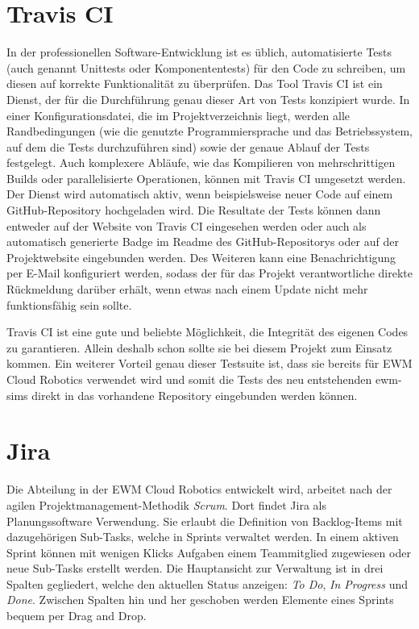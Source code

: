 \section{Travis CI}
\label{sec:travis-desc}
In der professionellen Software-Entwicklung ist es üblich, automatisierte Tests (auch genannt Unittests oder Komponententests) für den Code zu schreiben, um diesen auf korrekte Funktionalität zu überprüfen.
Das Tool Travis CI ist ein Dienst, der für die Durchführung genau dieser Art von Tests konzipiert wurde.
In einer Konfigurationsdatei, die im Projektverzeichnis liegt, werden alle Randbedingungen (wie die genutzte Programmiersprache und das Betriebssystem, auf dem die Tests durchzuführen sind) sowie der genaue Ablauf der Tests festgelegt.
Auch komplexere Abläufe, wie das Kompilieren von mehrschrittigen Builds oder parallelisierte Operationen, können mit Travis CI umgesetzt werden.
Der Dienst wird automatisch aktiv, wenn beispielsweise neuer Code auf einem GitHub-Repository hochgeladen wird.
Die Resultate der Tests können dann entweder auf der Website von Travis CI eingesehen werden oder auch als automatisch generierte Badge im Readme des GitHub-Repositorys oder auf der Projektwebsite eingebunden werden.
Des Weiteren kann eine Benachrichtigung per E-Mail konfiguriert werden, sodass der für das Projekt verantwortliche direkte Rückmeldung darüber erhält, wenn etwas nach einem Update nicht mehr funktionsfähig sein sollte.

Travis CI ist eine gute und beliebte Möglichkeit, die Integrität des eigenen Codes zu garantieren.
Allein deshalb schon sollte sie bei diesem Projekt zum Einsatz kommen.
Ein weiterer Vorteil genau dieser Testsuite ist, dass sie bereits für \ac{EWM} Cloud Robotics verwendet wird und somit die Tests des neu entstehenden \ac{ewm-sim}s direkt in das vorhandene Repository eingebunden werden können.

\section{Jira}
Die Abteilung in der \ac{EWM} Cloud Robotics entwickelt wird, arbeitet nach der agilen Projektmanagement-Methodik \emph{Scrum}.
Dort findet Jira als Planungssoftware Verwendung.
Sie erlaubt die Definition von Backlog-Items mit dazugehörigen Sub-Tasks, welche in Sprints verwaltet werden.
In einem aktiven Sprint können mit wenigen Klicks Aufgaben einem Teammitglied zugewiesen oder neue Sub-Tasks erstellt werden.
Die Hauptansicht zur Verwaltung ist in drei Spalten gegliedert, welche den aktuellen Status anzeigen: \emph{To Do}, \emph{In Progress} und \emph{Done}.
Zwischen Spalten hin und her geschoben werden Elemente eines Sprints bequem per Drag and Drop.